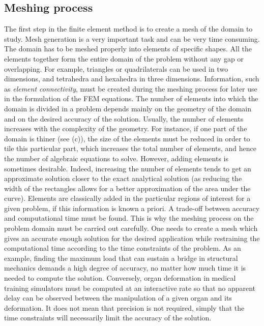 	\subsection{Meshing process}
The first step in the finite element method is to create a mesh of the domain to study. Mesh generation is a very important task and can be very time consuming. The domain has to be meshed properly into elements of specific shapes. All the elements together form the entire domain of the problem without any gap or overlapping. For example, triangles or quadrilaterals can be used in two dimensions, and tetrahedra and hexahedra in three dimensions. Information, such as \emph{element connectivity}, must be created during the meshing process for later use in the formulation of the FEM equations. The number of elements into which the domain is divided in a problem depends mainly on the geometry of the domain and on the desired accuracy of the solution. Usually, the number of elements increases with the complexity of the geometry. For instance, if one part of the domain is thiner (see  (c)), the size of the elements must be reduced in order to tile this particular part, which increases the total number of elements, and hence the number of algebraic equations to solve. However, adding elements is sometimes desirable. Indeed, increasing the number of elements tends to get an approximate solution closer to the exact analytical solution (as reducing the width of the rectangles allows for a better approximation of the area under the curve). Elements are classically added in the particular regions of interest for a given problem, if this information is known a priori. A trade-off between accuracy and computational time must be found. This is why the meshing process on the problem domain must be carried out carefully. One needs to create a mesh which gives an accurate enough solution for the desired application while restraining the computational time according to the time constraints of the problem. As an example, finding the maximum load that can sustain a bridge in structural mechanics demands a high degree of accuracy, no matter how much time it is needed to compute the solution. Conversely, organ deformation in medical training simulators must be computed at an interactive rate so that no apparent delay can be observed between the manipulation of a given organ and its deformation. It does not mean that precision is not required, simply that the time constraints will necessarily limit the accuracy of the solution. 
	
